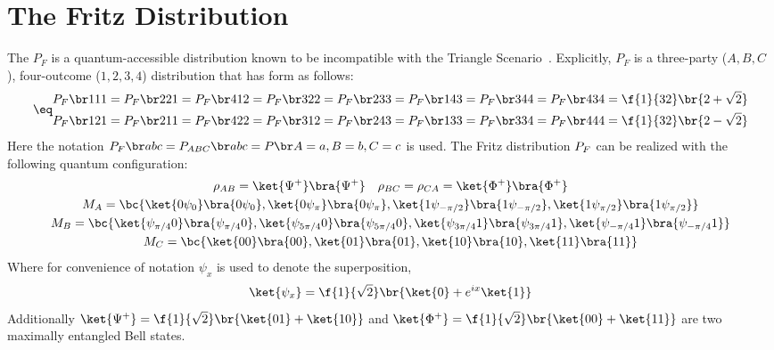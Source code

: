 \documentclass[aps, 10pt, english, twoside, pra, nofootinbib, longbibliography]{revtex4-1}
\begin{document}
    \section{The Fritz Distribution}
    \label{sec:fritz_dist}
    The  $P_F$ is a quantum-accessible distribution known to be incompatible with the Triangle Scenario~\cite{Fritz_2012}. Explicitly, $P_F$ is a three-party ($A,B,C$), four-outcome ($1,2,3,4$) distribution that has form as follows:
    \begin{align*}
    \eq \label{eq:fritz_dist}
    \begin{split}
    \prob[F][111] = \prob[F][221] = \prob[F][412] = \prob[F][322] = \prob[F][233] = \prob[F][143] = \prob[F][344] = \prob[F][434] &= \f{1}{32}\br{2 + \sqrt{2}} \\
    \prob[F][121] = \prob[F][211] = \prob[F][422] = \prob[F][312] = \prob[F][243] = \prob[F][133] = \prob[F][334] = \prob[F][444] &= \f{1}{32}\br{2 - \sqrt{2}}
    \end{split}
    \end{align*}
    Here the notation $\prob[F][abc] = \prob[ABC][abc] = \prob[][A=a,B=b,C=c]$ is used. The Fritz distribution $\prob[F]$ can be realized with the following quantum configuration:
    \begin{equation}
    \begin{gathered}
    \label{eq:fritz_quantum_realization}
    \rho_{AB} = \ket{\Psi^+}\bra{\Psi^+} \quad \rho_{BC} = \rho_{CA} = \ket{\gp^+}\bra{\gp^+} \\
    M_{A} = \bc{\ket{0\psi_0}\bra{0\psi_0}, \ket{0\psi_{\pi}}\bra{0\psi_{\pi}}, \ket{1\psi_{-\pi/2}}\bra{1\psi_{-\pi/2}}, \ket{1\psi_{\pi/2}}\bra{1\psi_{\pi/2}}} \\
    M_{B} = \bc{\ket{\psi_{\pi/4}0}\bra{\psi_{\pi/4}0}, \ket{\psi_{5\pi/4}0}\bra{\psi_{5\pi/4}0}, \ket{\psi_{3\pi/4}1}\bra{\psi_{3\pi/4}1}, \ket{\psi_{-\pi/4}1}\bra{\psi_{-\pi/4}1}} \\
    M_{C} = \bc{\ket{00}\bra{00}, \ket{01}\bra{01}, \ket{10}\bra{10}, \ket{11}\bra{11}}
    \end{gathered}
    \end{equation}
    Where for convenience of notation $\psi_x$ is used to denote the superposition,
    \[ \ket{\psi_x} = \f{1}{\sqrt{2}}\br{\ket{0} + e^{ix}\ket{1}} \]
    Additionally $\ket{\Psi^+} = \f{1}{\sqrt{2}}\br{\ket{01} + \ket{10}}$ and $\ket{\gp^+} = \f{1}{\sqrt{2}}\br{\ket{00} + \ket{11}}$ are two maximally entangled Bell states.
\end{document}
